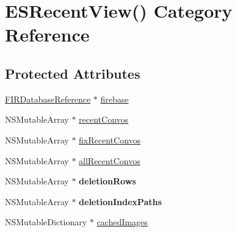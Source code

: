\hypertarget{category_e_s_recent_view_07_08}{}\section{E\+S\+Recent\+View() Category Reference}
\label{category_e_s_recent_view_07_08}
\subsection*{Protected Attributes}
\begin{DoxyCompactItemize}
\item 
\hyperlink{interface_f_i_r_database_reference}{F\+I\+R\+Database\+Reference} $\ast$ \hyperlink{category_e_s_recent_view_07_08_aac4c56d218e6afbfbdbcc1dcb8ef737a}{firebase}
\item 
N\+S\+Mutable\+Array $\ast$ \hyperlink{category_e_s_recent_view_07_08_aacf2b8c9021a727d30297f0b85081db4}{recent\+Convos}
\item 
N\+S\+Mutable\+Array $\ast$ \hyperlink{category_e_s_recent_view_07_08_a5eb0a1ad011f8828c6d3b9c542a56913}{fix\+Recent\+Convos}
\item 
N\+S\+Mutable\+Array $\ast$ \hyperlink{category_e_s_recent_view_07_08_ab0daaff918a5dbaee89f15e0428a9b3e}{all\+Recent\+Convos}
\item 
\hypertarget{category_e_s_recent_view_07_08_ae4c0161dca7b392db435ca9bc5f08ac7}{}N\+S\+Mutable\+Array $\ast$ {\bfseries deletion\+Rows}\label{category_e_s_recent_view_07_08_ae4c0161dca7b392db435ca9bc5f08ac7}

\item 
\hypertarget{category_e_s_recent_view_07_08_a95ca8e3856fb441ef1e856d3a14352c8}{}N\+S\+Mutable\+Array $\ast$ {\bfseries deletion\+Index\+Paths}\label{category_e_s_recent_view_07_08_a95ca8e3856fb441ef1e856d3a14352c8}

\item 
N\+S\+Mutable\+Dictionary $\ast$ \hyperlink{category_e_s_recent_view_07_08_ad8f47f7ca6633ae6955f2a06254e4cd5}{cached\+Images}
\end{DoxyCompactItemize}
